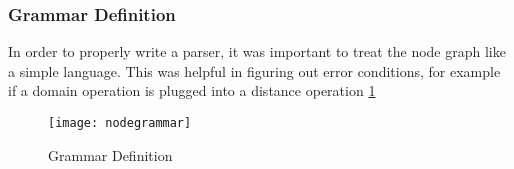 \documentclass[11pt,a4paper,final,notitlepage]{report}
\begin{document}
\subsubsection{Grammar Definition}
In order to properly write a parser, it was important to treat the node graph like a simple language. This was helpful in figuring out error conditions, for example if a domain operation is plugged into a distance operation \ref{fig:grammar}

\begin{figure}[h!]
	\texttt{[image: nodegrammar]}
	\caption{Grammar Definition}
	\label{fig:grammar}
\end{figure}



\nocite{*}



\end{document}
